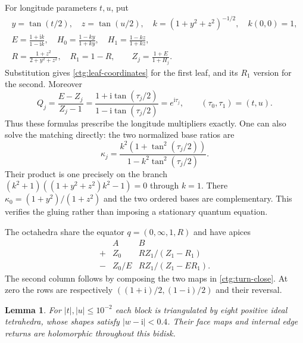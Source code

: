 \documentclass[11pt]{article}
\numberwithin{equation}{section}
\newtheorem{lemma}[theorem]{Lemma}
\theoremstyle{definition}
\theoremstyle{remark}
\newcommand{\ii}{\mathrm i}
\begin{document}
For longitude parameters $t,u$, put
\begin{equation}\label{ctg:angular-coordinates}
\begin{gathered}
 y=\tan(t/2),\quad z=\tan(u/2),\quad
 k=(1+y^2+z^2)^{-1/2},\quad k(0,0)=1,\\
 E=\frac{1+\ii k}{1-\ii k},\quad
 H_0=\frac{1-ky}{1+ky},\quad H_1=\frac{1-kz}{1+kz},\\
 R=\frac{1+z^2}{2+y^2+z^2},\quad R_1=1-R,\qquad
 Z_j=\frac{1+E}{1+H_j}.
\end{gathered}
\end{equation}
Substitution gives \eqref{ctg:leaf-coordinates} for the first leaf,
and its $R_1$ version for the second. Moreover
\begin{equation}\label{ctg:Q}
 Q_j=\frac{E-Z_j}{Z_j-1}=\frac{1+\ii\tan(\tau_j/2)}
                                     {1-\ii\tan(\tau_j/2)}
       =e^{\ii\tau_j},\qquad (\tau_0,\tau_1)=(t,u).
\end{equation}
Thus these formulas prescribe the longitude multipliers exactly.
One can also solve the matching directly: the two normalized base
ratios are
\[
 \kappa_j=\frac{k^2(1+\tan^2(\tau_j/2))}
                         {1-k^2\tan^2(\tau_j/2)}.
\]
Their product is one precisely on the branch
$(k^2+1)((1+y^2+z^2)k^2-1)=0$ through $k=1$.
There $\kappa_0=(1+y^2)/(1+z^2)$ and the two ordered bases are
complementary. This verifies the gluing rather than imposing a
stationary quantum equation.

The octahedra share the equator $q=(0,\infty,1,R)$ and have apices
\begin{equation}\label{ctg:apices}
\begin{array}{c|cc}
 &A&B\\\hline
 +&Z_0& RZ_1/(Z_1-R_1)\\
 -&Z_0/E& RZ_1/(Z_1-ER_1).
\end{array}
\end{equation}
The second column follows by composing the two maps in
\eqref{ctg:turn-close}. At zero the rows are respectively
$((1+\ii)/2,(1-\ii)/2)$ and their reversal.

\begin{lemma}\label{ctg:positive-chart}
For $|t|,|u|\le10^{-2}$ each block is triangulated by eight positive
ideal tetrahedra, whose shapes satisfy $|w-\ii|<0.4$.
Their face maps and internal edge returns are holomorphic throughout
this bidisk.
\end{lemma}
\end{document}
